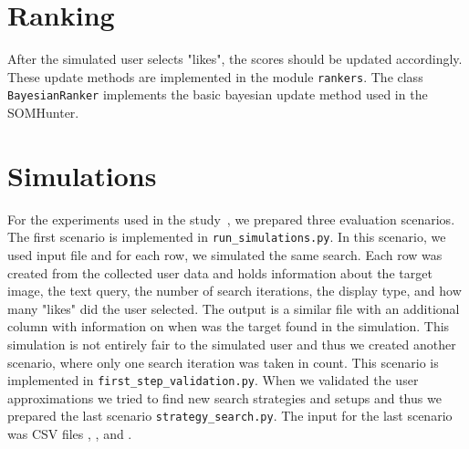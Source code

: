 \section{Ranking}

After the simulated user selects "likes", the scores should be updated accordingly. These update methods are implemented in the module \lstinline{rankers}. The class \lstinline{BayesianRanker} implements the basic bayesian update method used in the SOMHunter.

\section{Simulations}

For the experiments used in the study~\cite{peska2021}, we prepared three evaluation scenarios. The first scenario is implemented in \lstinline{run_simulations.py}. In this scenario, we used input file  and for each row, we simulated the same search. Each row was created from the collected user data and holds information about the target image, the text query,  the number of search iterations, the display type, and how many "likes" did the user selected. The output is a similar file with an additional column with information on when was the target found in the simulation. This simulation is not entirely fair to the simulated user and thus we created another scenario, where only one search iteration was taken in count. This scenario is implemented in \lstinline{first_step_validation.py}. When we validated the user approximations we tried to find new search strategies and setups and thus we prepared the last scenario \lstinline{strategy_search.py}. The input for the last scenario was CSV files , , and .


